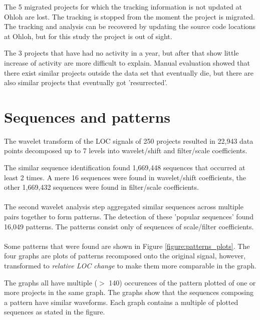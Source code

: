 The 5 migrated projects for which the tracking information is not updated at
Ohloh are lost. The tracking is stopped from the moment the project is
migrated. The tracking and analysis can be recovered by updating the source
code locations at Ohloh, but for this study the project is out of sight.

The 3 projects that have had no activity in a year, but after that show little
increase of activity are more difficult to explain. Manual evaluation showed
that there exist similar projects outside the data set that eventually die, but
there are also similar projects that eventually got 'resurrected'.



\section{Sequences and patterns}
The wavelet transform of the LOC signals of 250 projects resulted in 22,943
data points decomposed up to 7 levels into wavelet/shift and filter/scale
coefficients.

The similar sequence identification found 1,669,448 sequences that occurred
at least 2 times. A mere 16 sequences were found in wavelet/shift coefficients,
the other 1,669,432 sequences were found in filter/scale coefficients.

\paragraph{}
The second wavelet analysis step aggregated similar sequences across multiple
pairs together to form patterns. The detection of these 'popular sequences'
found 16,049 patterns. The patterns consist only of sequences of scale/filter
coefficients.

\paragraph{}
Some patterns that were found are shown in Figure \ref{figure:patterns_plots}.
The four graphs are plots of patterns recomposed onto the original signal,
however, transformed to \emph{relative LOC change }\rm to make them more
comparable in the graph.

The graphs all have multiple ($>$ 140) occurences of the pattern plotted of one
or more projects in the same graph. The graphs show that the sequences
composing a pattern have similar waveforms. Each graph contains a multiple of
plotted sequences as stated in the figure.

